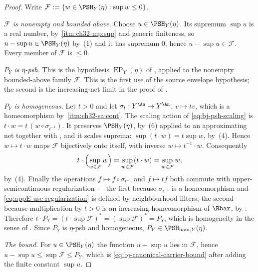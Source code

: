 \begin{proof}
Write $\mathcal F:=\{w\in\PSH_Y(\eta):\sup w\le0\}$.

\emph{$\mathcal F$ is nonempty and bounded above.}  Choose
$u\in\PSH_Y(\eta)$.  Its supremum $\sup u$ is a real number, by
\,\cref{itm:ch32-mp:sup} and generic
finiteness, so $u-\sup u\in\PSH_Y(\eta)$ by
\,(1) and it has supremum $0$; hence
$u-\sup u\in\mathcal F$.  Every member of $\mathcal F$ is $\le0$.

\emph{$P_Y$ is $\eta$-psh.}  This is the hypothesis
$\operatorname{EP}_Y(\eta)$ of , applied to
the nonempty bounded-above family $\mathcal F$.  This is the first use of
the source envelope hypothesis; the second is the increasing-net limit in
the proof of .

\emph{$P_Y$ is homogeneous.}  Let $t>0$ and let $\sigma_t:Y^{\An}\to
Y^{\An}$, $v\mapsto tv$, which is a homeomorphism by
\,\cref{itm:ch32-sa:cont}.  The scaling action
of \eqref{eq:bj-psh-scaling} is $t\cdot w=t\,(w\circ\sigma_{t^{-1}})$.
It preserves $\PSH_Y(\eta)$, by
\,(6) applied to an approximating net together
with , and it scales suprema:
$\sup(t\cdot w)=t\sup w$, by
\,(4).  Hence $w\mapsto t\cdot w$ maps
$\mathcal F$ bijectively onto itself, with inverse
$w\mapsto t^{-1}\cdot w$.  Consequently
\[
 t\cdot\Bigl(\sup_{w\in\mathcal F}w\Bigr)
 =\sup_{w\in\mathcal F}(t\cdot w)=\sup_{w\in\mathcal F}w,
\]
by \,(4).  Finally the operations
$f\mapsto f\circ\sigma_{t^{-1}}$ and $f\mapsto tf$ both commute with
upper-semicontinuous regularization --- the first because $\sigma_{t^{-1}}$
is a homeomorphism and \eqref{eq:appE-usc-regularization} is defined by
neighbourhood filters, the second because multiplication by $t>0$ is an
increasing homeomorphism of $\Rbar$, by
.  Therefore
$t\cdot P_Y=(t\cdot\sup\mathcal F)^*=(\sup\mathcal F)^*=P_Y$, which is
homogeneity in the sense of .  Since
$P_Y$ is $\eta$-psh and homogeneous,
$P_Y\in\PSH_{\mathrm{hom},Y}(\eta)$.

\emph{The bound.}  For $u\in\PSH_Y(\eta)$ the function $u-\sup u$ lies
in $\mathcal F$, hence $u-\sup u\le\sup\mathcal F\le P_Y$, which is
\eqref{eq:bj-canonical-carrier-bound} after adding the finite constant
$\sup u$.
\end{proof}

